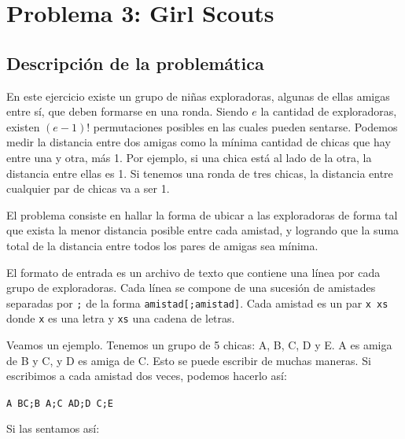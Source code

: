 \section{Problema 3: Girl Scouts}
\subsection{Descripción de la problemática}

En este ejercicio existe un grupo de niñas exploradoras, algunas de ellas amigas entre sí, que deben formarse en una ronda. Siendo $e$ la cantidad de exploradoras, existen $(e-1)!$ permutaciones posibles en las cuales pueden sentarse. Podemos medir la distancia entre dos amigas como la mínima cantidad de chicas que hay entre una y otra, más 1. Por ejemplo, si una chica está al lado de la otra, la distancia entre ellas es 1. Si tenemos una ronda de tres chicas, la distancia entre cualquier par de chicas va a ser 1.

El problema consiste en hallar la forma de ubicar a las exploradoras de forma tal que exista la menor distancia posible entre cada amistad, y logrando que la suma total de la distancia entre todos los pares de amigas sea mínima.

El formato de entrada es un archivo de texto que contiene una línea por cada grupo de exploradoras. Cada línea se compone de una sucesión de amistades separadas por \texttt{;} de la forma \texttt{amistad[;amistad]}. Cada amistad es un par \texttt{x xs} donde \texttt{x} es una letra y \texttt{xs} una cadena de letras.

Veamos un ejemplo. Tenemos un grupo de 5 chicas: A, B, C, D y E. A es amiga de B y C, y D es amiga de C. Esto se puede escribir de muchas maneras. Si escribimos a cada amistad dos veces, podemos hacerlo así:

\texttt{A BC;B A;C AD;D C;E}

Si las sentamos así:


